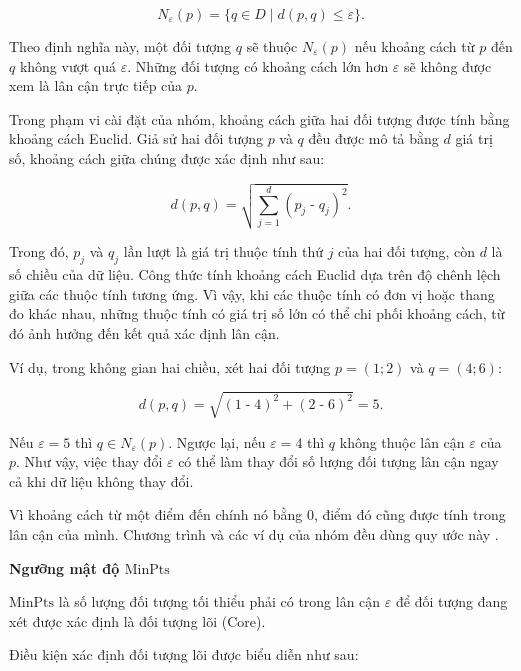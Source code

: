 \begin{equation}
    N_{\varepsilon}(p)
    = \{q \in D \mid d(p,q) \leq \varepsilon\}.
\end{equation}

Theo định nghĩa này, một đối tượng \(q\) sẽ thuộc \(N_{\varepsilon}(p)\) nếu khoảng cách từ \(p\) đến \(q\) không vượt quá \(\varepsilon\). Những đối tượng có khoảng cách lớn hơn \(\varepsilon\) sẽ không được xem là lân cận trực tiếp của \(p\).

Trong phạm vi cài đặt của nhóm, khoảng cách giữa hai đối tượng được tính bằng khoảng cách Euclid. Giả sử hai đối tượng \(p\) và \(q\) đều được mô tả bằng \(d\) giá trị số, khoảng cách giữa chúng được xác định như sau:

\begin{equation}
    d(p,q)
    = \sqrt{\sum_{j=1}^{d}(p_j\;\text{-}\;q_j)^2}.
\end{equation}

Trong đó, \(p_j\) và \(q_j\) lần lượt là giá trị thuộc tính thứ \(j\) của hai đối tượng, còn \(d\) là số chiều của dữ liệu. Công thức tính khoảng cách Euclid dựa trên độ chênh lệch giữa các thuộc tính tương ứng. Vì vậy, khi các thuộc tính có đơn vị hoặc thang đo khác nhau, những thuộc tính có giá trị số lớn có thể chi phối khoảng cách, từ đó ảnh hưởng đến kết quả xác định lân cận.

Ví dụ, trong không gian hai chiều, xét hai đối tượng \(p=(1;2)\) và \(q=(4;6)\):

\begin{equation}
    d(p,q)=\sqrt{(1\;\text{-}\;4)^2+(2\;\text{-}\;6)^2}=5.
\end{equation}

Nếu \(\varepsilon=5\) thì \(q\in N_{\varepsilon}(p)\). Ngược lại, nếu \(\varepsilon=4\) thì \(q\) không thuộc lân cận \(\varepsilon\) của \(p\). Như vậy, việc thay đổi \(\varepsilon\) có thể làm thay đổi số lượng đối tượng lân cận ngay cả khi dữ liệu không thay đổi.

Vì khoảng cách từ một điểm đến chính nó bằng 0, điểm đó cũng được tính trong lân cận của mình. Chương trình và các ví dụ của nhóm đều dùng quy ước này \parencite{ester1996dbscan}.

\textbf{Ngưỡng mật độ \(\mathrm{MinPts}\)}

\(\mathrm{MinPts}\) là số lượng đối tượng tối thiểu phải có trong lân cận \(\varepsilon\) để đối tượng đang xét được xác định là đối tượng lõi (Core).

Điều kiện xác định đối tượng lõi được biểu diễn như sau:


